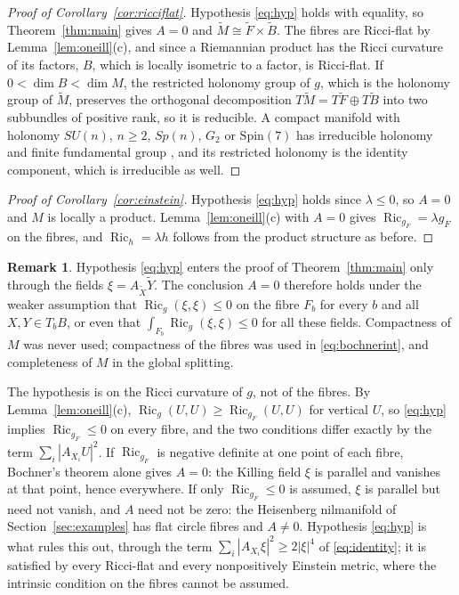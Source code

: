 \documentclass[11pt,reqno]{amsart}
\theoremstyle{plain}
\theoremstyle{definition}
\newtheorem{remark}[theorem]{Remark}
\newcommand{\Ric}{\operatorname{Ric}}
\newcommand{\bas}[1]{\widetilde{#1}}
\begin{document}
\begin{proof}[Proof of Corollary~\ref{cor:ricciflat}]
Hypothesis \eqref{eq:hyp} holds with equality, so Theorem~\ref{thm:main} gives $A=0$ and $\bas M\cong\bas F\times\bas B$. The fibres are Ricci-flat by Lemma~\ref{lem:oneill}(c), and since a Riemannian product has the Ricci curvature of its factors, $B$, which is locally isometric to a factor, is Ricci-flat. If $0<\dim B<\dim M$, the restricted holonomy group of $g$, which is the holonomy group of $\bas M$, preserves the orthogonal decomposition $T\bas M=T\bas F\oplus T\bas B$ into two subbundles of positive rank, so it is reducible. A compact manifold with holonomy $SU(n)$, $n\ge2$, $Sp(n)$, $G_2$ or $\mathrm{Spin}(7)$ has irreducible holonomy and finite fundamental group \cite{Beauville1983,Joyce2000}, and its restricted holonomy is the identity component, which is irreducible as well.
\end{proof}

\begin{proof}[Proof of Corollary~\ref{cor:einstein}]
Hypothesis \eqref{eq:hyp} holds since $\lambda\le0$, so $A=0$ and $M$ is locally a product. Lemma~\ref{lem:oneill}(c) with $A=0$ gives $\Ric_{g_F}=\lambda g_F$ on the fibres, and $\Ric_h=\lambda h$ follows from the product structure as before.
\end{proof}

\begin{remark}\label{rem:general}
Hypothesis \eqref{eq:hyp} enters the proof of Theorem~\ref{thm:main} only through the fields $\xi=A_{\bas X}\bas Y$. The conclusion $A=0$ therefore holds under the weaker assumption that $\Ric_g(\xi,\xi)\le0$ on the fibre $F_b$ for every $b$ and all $X,Y\in T_bB$, or even that $\int_{F_b}\Ric_g(\xi,\xi)\le0$ for all these fields. Compactness of $M$ was never used; compactness of the fibres was used in \eqref{eq:bochnerint}, and completeness of $M$ in the global splitting.

The hypothesis is on the Ricci curvature of $g$, not of the fibres. By Lemma~\ref{lem:oneill}(c), $\Ric_g(U,U)\ge\Ric_{g_F}(U,U)$ for vertical $U$, so \eqref{eq:hyp} implies $\Ric_{g_F}\le0$ on every fibre, and the two conditions differ exactly by the term $\sum_i|A_{X_i}U|^2$. If $\Ric_{g_F}$ is negative definite at one point of each fibre, Bochner's theorem alone gives $A=0$: the Killing field $\xi$ is parallel and vanishes at that point, hence everywhere. If only $\Ric_{g_F}\le0$ is assumed, $\xi$ is parallel but need not vanish, and $A$ need not be zero: the Heisenberg nilmanifold of Section~\ref{sec:examples} has flat circle fibres and $A\ne0$. Hypothesis \eqref{eq:hyp} is what rules this out, through the term $\sum_i|A_{X_i}\xi|^2\ge2|\xi|^4$ of \eqref{eq:identity}; it is satisfied by every Ricci-flat and every nonpositively Einstein metric, where the intrinsic condition on the fibres cannot be assumed.
\end{remark}
\end{document}
